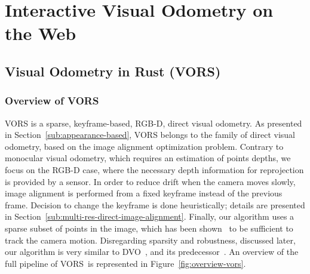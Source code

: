 \chapter{Interactive Visual Odometry on the Web}%
\label{cha:interactive_vo_on_the_web}

\minitoc%
\clearpage

\section{Visual Odometry in Rust (VORS)}%
\label{sec:vors}

\subsection{Overview of VORS}%
\label{sub:vors-overview}

VORS is a sparse, keyframe-based, RGB-D, direct visual odometry.
As presented in Section~\ref{sub:appearance-based},
VORS belongs to the family of direct visual odometry,
based on the image alignment optimization problem.
Contrary to monocular visual odometry, which requires an estimation
of points depths, we focus on the RGB-D case,
where the necessary depth information for reprojection is provided by a sensor.
In order to reduce drift when the camera moves slowly,
image alignment is performed from a fixed keyframe instead of the previous frame.
Decision to change the keyframe is done heuristically;
details are presented in Section~\ref{sub:multi-res-direct-image-alignment}.
Finally, our algorithm uses a sparse subset of points in the image,
which has been shown~\cite{engel2017direct} to be sufficient to track the camera motion.
Disregarding sparsity and robustness, discussed later,
our algorithm is very similar to DVO~\cite{kerl2013robust},
and its predecessor~\cite{steinbrucker2011real}.
An overview of the full pipeline of VORS is represented in Figure~\ref{fig:overview-vors}.

